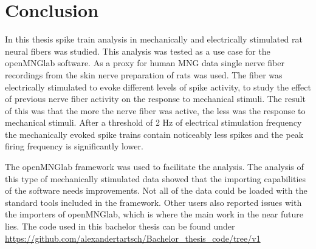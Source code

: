 \chapter{Conclusion}
In this thesis spike train analysis in mechanically and electrically stimulated rat neural fibers was studied. This analysis was tested as a use case for the openMNGlab software. As a proxy for human MNG data single nerve fiber recordings from the skin nerve preparation of rats was used. The fiber was electrically stimulated to evoke different levels of spike activity, to study the effect of previous nerve fiber activity on the response to mechanical stimuli. 
The result of this was that the more the nerve fiber was active, the less was the response to mechanical stimuli. After a threshold of 2 Hz of electrical stimulation frequency the mechanically evoked spike trains contain noticeably less spikes and the peak firing frequency is significantly lower.

The openMNGlab framework was used to facilitate the analysis. The analysis of this type of mechanically stimulated data showed that the importing capabilities of the software needs improvements. Not all of the data could be loaded with the standard tools included in the framework. Other users also reported issues with the importers of openMNGlab, which is where the main work in the near future lies. The code used in this bachelor thesis can be found under \url{https://github.com/alexandertartsch/Bachelor_thesis_code/tree/v1}


\cleardoublepage
